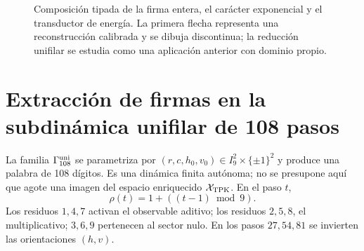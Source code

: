 \begin{figure}[htbp]
\centering
{}
\caption{Composición tipada de la firma entera, el carácter exponencial y el
transductor de energía. La primera flecha representa una reconstrucción
calibrada y se dibuja discontinua; la reducción unifilar se estudia como una
aplicación anterior con dominio propio.}
\label{fig:cadena-masa}
\end{figure}

\section{Extracción de firmas en la subdinámica unifilar de 108 pasos}

La familia \(\Gamma_{108}^{\rm uni}\) se parametriza por
\((r,c,h_0,v_0)\in I_9^2\times\{\pm1\}^2\) y produce una palabra de 108
dígitos. Es una dinámica finita autónoma; no se presupone aquí que agote una
imagen del espacio enriquecido \(\mathcal X_{\rm TPK}\). En el paso
\(t\),
\[
 \rho(t)=1+((t-1)\bmod9).
\]
Los residuos \(1,4,7\) activan el observable aditivo; los residuos \(2,5,8\),
el multiplicativo; \(3,6,9\) pertenecen al sector nulo. En los pasos
\(27,54,81\) se invierten las orientaciones \((h,v)\).

